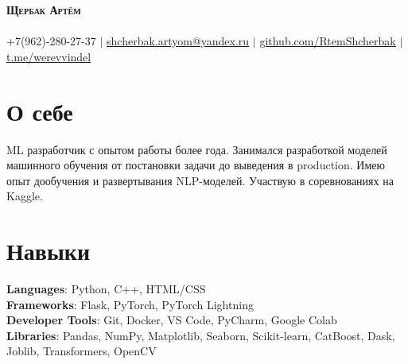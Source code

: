 \documentclass[letterpaper,11pt]{article}
\newcommand{\resumeSubHeadingListStart}{\begin{itemize}[leftmargin=0.15in, label={}]}
\newcommand{\resumeSubHeadingListEnd}{\end{itemize}}
\begin{document}

\begin{center}
    \textbf{\Huge \scshape Щербак Артём} \\ \vspace{10pt}
     \\ \vspace{10pt}
    \small +7(962)-280-27-37 $|$ 
    \href{mailto:shcherbak.artyom@yandex.ru}{\underline{shcherbak.artyom@yandex.ru}} $|$ 
    \href{https://github.com/RtemShcherbak}{\underline{github.com/RtemShcherbak}} $|$
    \href{https://t.me/werevvindel}{\underline{t.me/werevvindel}}
\end{center}

\section{О себе}
  \resumeSubHeadingListStart
  {ML разработчик с опытом работы более года. Занимался разработкой моделей машинного обучения от постановки задачи до выведения в production. Имею опыт дообучения и развертывания NLP-моделей. Участвую в соревнованиях на Kaggle. }
  \resumeSubHeadingListEnd

\section{Навыки}
 \begin{itemize}[leftmargin=0.15in, label={}]
    \small{\item{
     \textbf{Languages}{: Python, C++, HTML/CSS} \\
     \textbf{Frameworks}{: Flask, PyTorch, PyTorch Lightning} \\
     \textbf{Developer Tools}{: Git, Docker, VS Code, PyCharm, Google Colab} \\
     \textbf{Libraries}{: Pandas, NumPy, Matplotlib, Seaborn, Scikit-learn, CatBoost, Dask, Joblib, Transformers, OpenCV }
    }}
 \end{itemize}
\end{document}
